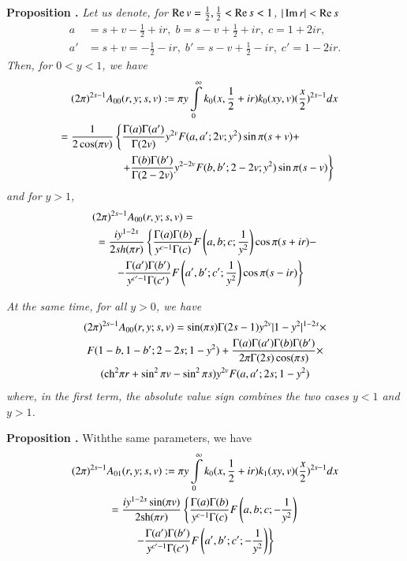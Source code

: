 \medskip
\noindent
{\bfseries Proposition .\label{art7-prop1}}
\textit{Let us denote, for $\operatorname{Re} v = \frac{1}{2},\frac{1}{2} < \operatorname{Re} s < 1$, $|\operatorname{Im} r| < \operatorname{Re} s$}
\begin{align}
a & = s+v - \frac{1}{2} + ir, \; b = s - v + \frac{1}{2} + ir, \; c = 1 + 2 ir, \label{art7-eq1.74}\\
a' & = s + v =-\frac{1}{2} - ir, \; b' = s-v +\frac{1}{2} - ir, \; c' = 1-2ir. \label{art7-eq1.75}
\end{align}
\textit{Then, for $0< y < 1$, we have}
\begin{gather}
(2\pi)^{2s-1} A_{00}(r,y;s,v) : = \pi y \int\limits^\infty_0 k_0 (x, \frac{1}{2} + ir) k_0 (xy, v) (\frac{x}{2})^{2s-1} dx\label{art7-eq1.76}\\
= \frac{1}{2\cos (\pi v)} \left\{\frac{\Gamma (a) \Gamma (a')}{\Gamma (2v)} y^{2v} F(a, a'; 2v; y^2) \sin \pi (s+v) + \right. \hspace{1.5cm}\notag\\
\hspace{1.5cm} \left. +\frac{\Gamma (b) \Gamma (b')}{\Gamma (2-2v)} y^{2-2v} F (b, b'; 2-2v; y^2) \sin \pi (s-v)  \right\} \notag
\end{gather}
\textit{and for $y>1$,}
\begin{align}
& (2\pi)^{2s-1} A_{00} (r, y; s, v)= \label{art7-eq1.77}\\
& \; = \frac{iy^{1-2s}}{2sh (\pi r)} \left\{\frac{\Gamma (a) \Gamma (b)}{y^{c-1} \Gamma (c)} F \left(a, b; c; \frac{1}{y^2} \right) \cos \pi (s+ir) - \right. \notag\\
& \qquad \left. - \frac{\Gamma (a') \Gamma (b')}{y^{c'-1} \Gamma (c')}  F \left(a', b'; c'; \frac{1}{y^2} \right)  \cos \pi (s-ir)\right\} \notag
\end{align}

\textit{At the same time, for all $y>0$, we have}
\begin{gather}
(2\pi)^{2s-1} A_{00} (r, y; s, v) = \sin (\pi s) \Gamma (2s-1) y^{2v} |1-y^2|^{1-2s} \times \label{art7-eq1.78}\\
F(1-b, 1-b'; 2 - 2s; 1-y^2) + \frac{\Gamma (a) \Gamma (a') \Gamma (b) \Gamma (b')}{2\pi \Gamma (2s) \cos (\pi s)} \times \notag\\
(\text{ch}^2 \pi r + \sin^2 \pi v - \sin^2 \pi s) y^{2v} F (a, a'; 2s; 1-y^2) \notag 
\end{gather}
\textit{where, in the first term, the absolute value sign combines the two cases $y<1$ and $y>1$.}

\medskip
\noindent
{\bfseries Proposition .\label{art7-prop2}}
With\pageoriginale the same parameters, we have
\begin{gather}
(2\pi)^{2s-1} A_{01} (r, y; s, v) : = \pi y \int\limits^\infty_0 k_0 (x, \frac{1}{2} + ir)  k_1 (xy, v) (\frac{x}{2})^{2s-1} dx \label{art7-eq1.79}\\
= \frac{iy^{1-2s} \sin (\pi v)}{2\text{sh} (\pi r)} \left\{\frac{\Gamma (a) \Gamma (b)}{y^{c-1} \Gamma (c)} F \left(a, b; c; -\frac{1}{y^2} \right) \right.\notag\\
\left. -\frac{\Gamma (a') \Gamma (b')}{y^{c'-1} \Gamma (c')} F \left(a',b '; c'; -\frac{1}{y^2} \right) \right\} \notag
\end{gather}

